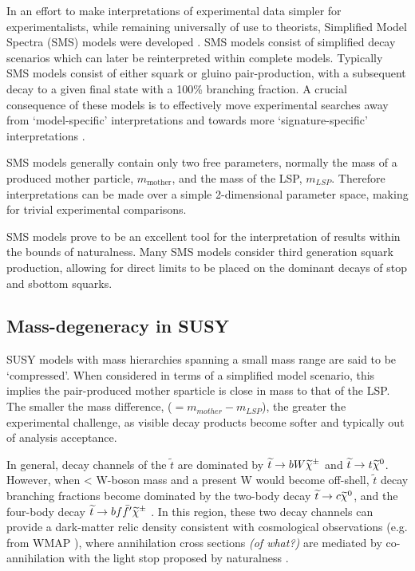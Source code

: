 In an effort to make interpretations of experimental data simpler for
experimentalists, while remaining universally of use to theorists,
Simplified Model Spectra (SMS) models were developed
\cite{PhysRevD.79.075020,Alves:2011wf}.
SMS models consist of simplified
decay scenarios which can later be reinterpreted within complete models.
Typically SMS models consist of either squark or gluino pair-production, with a
subsequent decay to a given final state with a 100\% branching fraction.
A crucial consequence of these models is to effectively move
experimental searches away from `model-specific' interpretations and
towards more `signature-specific' interpretations \cite{PhysRevD.88.052017}.

SMS models generally contain only two free parameters, normally the mass of a
produced mother particle, $m_{\text{mother}}$, and the mass of the LSP,
$m_{LSP}$. Therefore interpretations can be made over a simple 2-dimensional
parameter space, making for trivial experimental comparisons.

SMS models prove to be an excellent tool for the interpretation of results
within the bounds of naturalness. Many SMS models consider third generation
squark production, allowing for direct limits to be placed on the dominant
decays of stop and sbottom squarks.

\subsection{Mass-degeneracy in SUSY}
SUSY models with mass hierarchies spanning a small mass range are said to be
`compressed'. When considered in terms of a simplified model scenario, this
implies the pair-produced mother sparticle is close in mass to that of the LSP.
The
smaller the mass difference, \deltam ($= m_{mother} - m_{LSP}$), the greater the
experimental challenge, as visible
decay products become softer and typically out of analysis acceptance.

In general, decay channels of the $\tilde{t}$ are dominated by $\widetilde{t}\rightarrow
bW\widetilde{\chi}^{\pm}$ and
$\widetilde{t}\rightarrow t\widetilde{\chi}^{0}$. However, when \deltam < W-boson
mass and a present W would become off-shell, $\tilde{t}$ decay branching
fractions
become
dominated by the two-body decay $\widetilde{t}\rightarrow c\widetilde{\chi}^{0}$, and the four-body decay
$\widetilde{t}\rightarrow bf\bar{f}'\widetilde{\chi}^{\pm}$ \cite{Boehm:1999tr}. In this region, these two decay
channels can provide a dark-matter relic density consistent with cosmological
observations (e.g. from WMAP \cite{Spergel:2003cb}), where annihilation cross
sections \emph{(of what?)}
are mediated by co-annihilation with the light stop proposed by naturalness
\cite{Balazs:2004bu,Martin:2007gf}.


